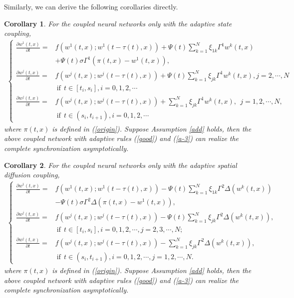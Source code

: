 \documentclass[review]{elsarticle}
\newtheorem{col}{Corollary}
\begin{document}
Similarly, we can derive the following corollaries directly.
\begin{col}
For the coupled neural networks only with the adaptive state coupling,
\begin{align*}
\left\{
\begin{array}{cl}
\frac{\partial{w^1(t,x)}}{\partial{t}}=&f(w^1(t,x);w^1(t-\tau(t),x))+\Psi(t)\sum\limits_{k=1}^N\xi_{1k}\Gamma^1
w^k(t,x)\\
&+\Psi(t)\sigma\Gamma^1 (\pi(t,x)-w^1(t,x)),\\
\frac{\partial{w^j(t,x)}}{\partial{t}}=&f(w^j(t,x);w^j(t-\tau(t),x))+\Psi(t)\sum\limits_{k=1}^N\xi_{jk}\Gamma^1
w^k(t,x), j=2,\cdots,N\\
&~\mathrm{if}~~t\in [t_i,s_i], i=0,1,2,\cdots\\
\frac{\partial{w^j(t,x)}}{\partial{t}}=&f(w^j(t,x);w^j(t-\tau(t),x))+\sum\limits_{k=1}^N\xi_{jk}\Gamma^1
w^k(t,x), ~~j=1,2,\cdots,N,\\
&~\mathrm{if}~~t\in (s_i,t_{i+1}), i=0,1,2,\cdots
\end{array}
\right.
\end{align*}
where $\pi(t,x)$ is defined in (\ref{origin}). Suppose Assumption \ref{add} holds, then the above coupled network with adaptive rules (\ref{good}) and (\ref{a-3}) can realize the complete synchronization asymptotically.
\end{col}

\begin{col}
For the coupled neural networks only with the adaptive spatial diffusion coupling,
\begin{align*}
\left\{
\begin{array}{cl}
\frac{\partial{w^1(t,x)}}{\partial{t}}=&f(w^1(t,x);w^1(t-\tau(t),x))-\Psi(t)\sum\limits_{k=1}^N\xi_{1k}\Gamma^2
\Delta(w^k(t,x))\\
&-\Psi(t)\sigma\Gamma^2 \Delta(\pi(t,x)-w^1(t,x)),\\
\frac{\partial{w^j(t,x)}}{\partial{t}}=&f(w^j(t,x);w^j(t-\tau(t),x))-\Psi(t)\sum\limits_{k=1}^N\xi_{jk}\Gamma^2
\Delta(w^k(t,x)), \\
&~\mathrm{if}~~t\in [t_i,s_i], i=0,1,2,\cdots, j=2,3,\cdots,N;\\
\frac{\partial{w^j(t,x)}}{\partial{t}}=&f(w^j(t,x);w^j(t-\tau(t),x))-\sum\limits_{k=1}^N\xi_{jk}\Gamma^2
\Delta(w^k(t,x)), \\
&~\mathrm{if}~~t\in (s_i,t_{i+1}), i=0,1,2,\cdots, j=1,2,\cdots,N.
\end{array}
\right.
\end{align*}
where $\pi(t,x)$ is defined in (\ref{origin}). Suppose Assumption \ref{add} holds, then the above coupled network with adaptive rules (\ref{good}) and (\ref{a-3}) can realize the complete synchronization asymptotically.
\end{col}
\end{document}
